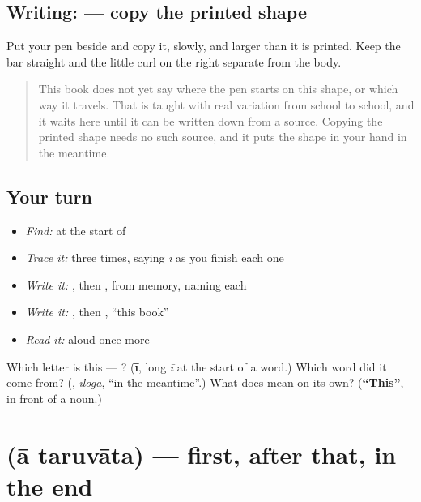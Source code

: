\subsection*{Writing:  — copy the printed shape}
Put your pen beside \textbf{} and copy it, slowly, and larger than it is printed. Keep the bar straight and the little curl on the right separate from the body.

\begin{quote}
This book does not yet say where the pen starts on this shape, or which way it travels. That is taught with real variation from school to school, and it waits here until it can be written down from a source. Copying the printed shape needs no such source, and it puts the shape in your hand in the meantime.
\end{quote}

\subsection*{Your turn}
\begin{itemize}
\raggedright
  \item \emph{Find:}  at the start of \textbf{}
  \item \emph{Trace it:}  three times, saying \emph{ī} as you finish each one
  \item \emph{Write it:} , then , from memory, naming each
  \item \emph{Write it:} \textbf{}, then \textbf{ }, \textquotedblleft{}this book\textquotedblright{}
  \item \emph{Read it:} \textbf{} aloud once more
\end{itemize}

\begin{tcolorbox}[breakable,colback=teal!4,colframe=teal!35!black,title={Before you move on}]
Which letter is this — ? (\textbf{ī}, long \emph{ī} at the start of a word.) Which word did it come from? (\textbf{}, \emph{īlōgā}, \textquotedblleft{}in the meantime\textquotedblright{}.) What does \textbf{} mean on its own? (\textbf{\textquotedblleft{}This\textquotedblright{}}, in front of a noun.)
\end{tcolorbox}
\section[\texorpdfstring{\te{ఆ} \te{తరువాత} (ā taruvāta)}{ఆ తరువాత (ā taruvāta)}]{  (ā taruvāta) — first, after that, in the end}

